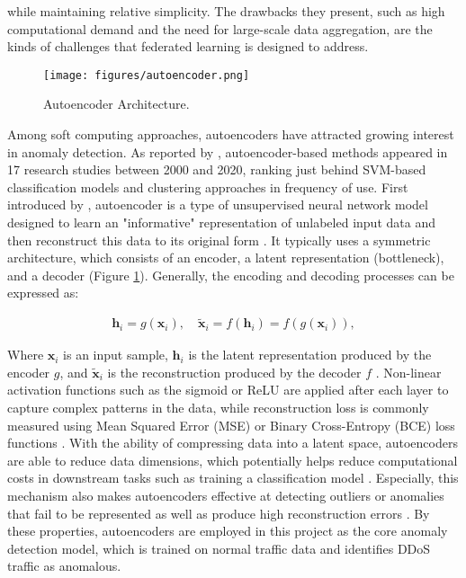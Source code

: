 while maintaining relative simplicity. The drawbacks they present, such as high computational demand and the need for large-scale data aggregation, are the kinds of challenges that federated learning is designed to address.


\begin{figure}[h]
    \centering
    \texttt{[image: figures/autoencoder.png]}
    \caption{Autoencoder Architecture.}
    \label{fig:autoencoder_architecture}
\end{figure}

Among soft computing approaches, autoencoders have attracted growing interest in anomaly detection. As reported by \cite{9439459}, autoencoder-based methods appeared in 17 research studies between 2000 and 2020, ranking just behind SVM-based classification models and clustering approaches in frequency of use. First introduced by \cite{10.5555/104279.104293}, autoencoder is a type of unsupervised neural network model designed to learn an "informative" representation of unlabeled input data and then reconstruct this data to its original form \citep{michelucci2022introductionautoencoders}. It typically uses a symmetric architecture, which consists of an encoder, a latent representation (bottleneck), and a decoder (Figure \ref{fig:autoencoder_architecture}). Generally, the encoding and decoding processes can be expressed as:

\begin{align}
\mathbf{h}_i = g(\mathbf{x}_i), \quad \tilde{\mathbf{x}}_i = f(\mathbf{h}_i) = f(g(\mathbf{x}_i)),
\end{align}

Where $\mathbf{x}_i$ is an input sample, $\mathbf{h}_i$ is the latent representation produced by the encoder $g$, and $\tilde{\mathbf{x}}_i$ is the reconstruction produced by the decoder $f$ \citep{michelucci2022introductionautoencoders}. Non-linear activation functions such as the sigmoid or ReLU are applied after each layer to capture complex patterns in the data, while reconstruction loss is commonly measured using Mean Squared Error (MSE) or Binary Cross-Entropy (BCE) loss functions \citep{michelucci2022introductionautoencoders}. With the ability of compressing data into a latent space, autoencoders are able to reduce data dimensions, which potentially helps reduce computational costs in downstream tasks such as training a classification model \citep{michelucci2022introductionautoencoders}. Especially, this mechanism also makes autoencoders effective at detecting outliers or anomalies that fail to be represented as well as produce high reconstruction errors \citep{michelucci2022introductionautoencoders}. By these properties, autoencoders are employed in this project as the core anomaly detection model, which is trained on normal traffic data and identifies DDoS traffic as anomalous.

